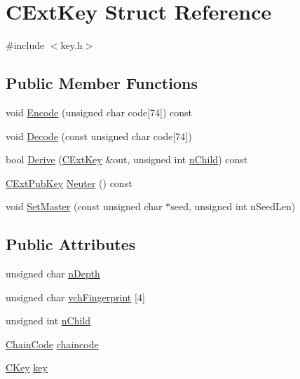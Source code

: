 \hypertarget{struct_c_ext_key}{}\section{C\+Ext\+Key Struct Reference}
\label{struct_c_ext_key}


{\ttfamily \#include $<$key.\+h$>$}

\subsection*{Public Member Functions}
\begin{DoxyCompactItemize}
\item 
void \mbox{\hyperlink{struct_c_ext_key_a4f68dfccef42685d954d3fb22fd6c67c}{Encode}} (unsigned char code\mbox{[}74\mbox{]}) const
\item 
void \mbox{\hyperlink{struct_c_ext_key_a9720e119745472336b6729e19f0819dd}{Decode}} (const unsigned char code\mbox{[}74\mbox{]})
\item 
bool \mbox{\hyperlink{struct_c_ext_key_a589df63664c6d12bfe071b747a245b1d}{Derive}} (\mbox{\hyperlink{struct_c_ext_key}{C\+Ext\+Key}} \&out, unsigned int \mbox{\hyperlink{struct_c_ext_key_ad15cb7ab68b59495eec71f6586803048}{n\+Child}}) const
\item 
\mbox{\hyperlink{struct_c_ext_pub_key}{C\+Ext\+Pub\+Key}} \mbox{\hyperlink{struct_c_ext_key_a4ea6bbc6c9bda4f8d77cade114155569}{Neuter}} () const
\item 
void \mbox{\hyperlink{struct_c_ext_key_a8cd6ecafdd649082601d7eebbec79688}{Set\+Master}} (const unsigned char $\ast$seed, unsigned int n\+Seed\+Len)
\end{DoxyCompactItemize}
\subsection*{Public Attributes}
\begin{DoxyCompactItemize}
\item 
unsigned char \mbox{\hyperlink{struct_c_ext_key_ab197a253f41646975405b4ead8027b55}{n\+Depth}}
\item 
unsigned char \mbox{\hyperlink{struct_c_ext_key_a22efb3f5dfb26cd8d88d2ab5db885978}{vch\+Fingerprint}} \mbox{[}4\mbox{]}
\item 
unsigned int \mbox{\hyperlink{struct_c_ext_key_ad15cb7ab68b59495eec71f6586803048}{n\+Child}}
\item 
\mbox{\hyperlink{hash_8h_aa201a9867f780a040c7af908e0a85db3}{Chain\+Code}} \mbox{\hyperlink{struct_c_ext_key_ab963200521bcc38d0f68c2d062b5da72}{chaincode}}
\item 
\mbox{\hyperlink{class_c_key}{C\+Key}} \mbox{\hyperlink{struct_c_ext_key_a93cd93ef3311d9dbcf475282a5f80fb2}{key}}
\end{DoxyCompactItemize}
